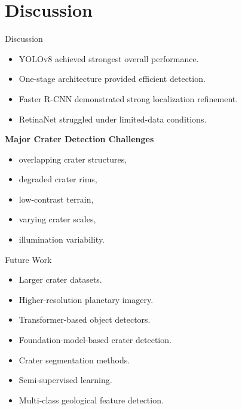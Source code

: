 \documentclass{beamer}
\begin{document}
	\section{Discussion}
	
	\begin{frame}{Discussion}
		
		\begin{itemize}
			\item YOLOv8 achieved strongest overall performance.
			\item One-stage architecture provided efficient detection.
			\item Faster R-CNN demonstrated strong localization refinement.
			\item RetinaNet struggled under limited-data conditions.
		\end{itemize}
		
		\vspace{0.4cm}
		
		\textbf{Major Crater Detection Challenges}
		
		\begin{itemize}
			\item overlapping crater structures,
			\item degraded crater rims,
			\item low-contrast terrain,
			\item varying crater scales,
			\item illumination variability.
		\end{itemize}
		
	\end{frame}
	
	\begin{frame}{Future Work}
		
		\begin{itemize}
			\item Larger crater datasets.
			\item Higher-resolution planetary imagery.
			\item Transformer-based object detectors.
			\item Foundation-model-based crater detection.
			\item Crater segmentation methods.
			\item Semi-supervised learning.
			\item Multi-class geological feature detection.
		\end{itemize}
		
		\vspace{0.5cm}
		
		\begin{center}
		\end{center}
		
	\end{frame}
	
\end{document}
